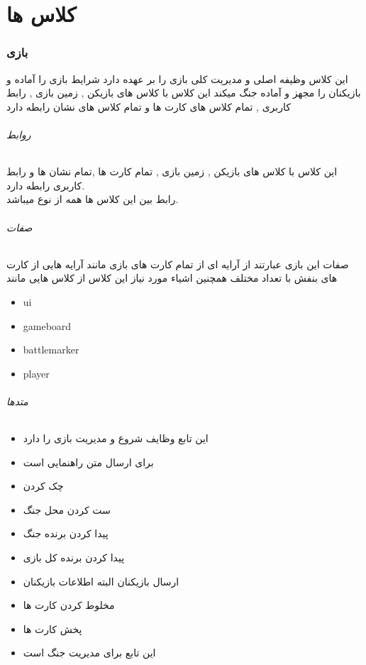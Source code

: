\documentclass[pdf,titlepage,a4paper]{report}
\begin{document}
	\part{کلاس ها}
		
	\newpage
	\section{بازی}
	این کلاس وظیفه اصلی و مدیریت کلی بازی را بر عهده دارد شرایط بازی را آماده و بازیکنان را مجهز و آماده جنگ میکند
	این کلاس با کلاس های بازیکن , زمین بازی , رابط کاربری , تمام کلاس های کارت ها و تمام کلاس های نشان رابطه دارد
	\paragraph{روابط}
	این کلاس با کلاس های بازیکن , زمین بازی , تمام کارت ها ,تمام نشان ها و رابط کاربری رابطه دارد.\\
	رابط بین این کلاس ها همه از نوع میباشد.\\

	\paragraph{صفات}
	صفات این بازی عبارتند از آرایه ای از تمام کارت های بازی مانند آرایه هایی از کارت های بنفش با تعداد مختلف
	همچنین اشیاء مورد نیاز این کلاس از کلاس هایی مانند
	\begin{latin}
		\begin{itemize}
			\item ui
			\item gameboard
			\item battlemarker
			\item player
		\end{itemize}
	\end{latin}
	\paragraph{متدها}
	\begin{itemize}
		\item {} این تابع وظایف شروع و مدیریت بازی را دارد
		\item {} برای ارسال متن راهنمایی است
		\item {} چک کردن 
		\item {} ست کردن محل جنگ
		\item {} پیدا کردن برنده جنگ 
		\item {} پیدا کردن برنده کل بازی 
		\item {} ارسال بازیکنان البته اطلاعات بازیکنان
		\item {} مخلوط کردن کارت ها
		\item {} پخش کارت ها
		\item {} این تابع برای مدیریت جنگ است
	\end{itemize}
	\newpage
\end{document}
